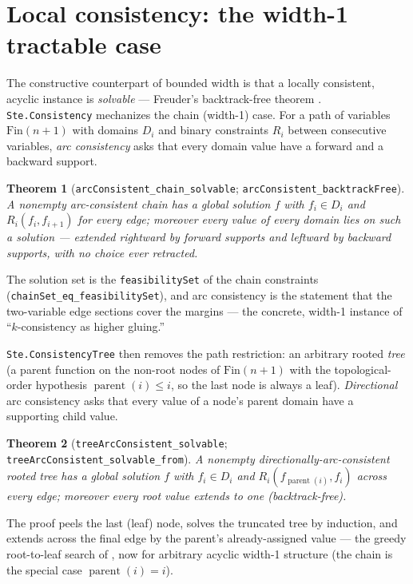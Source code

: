 \documentclass[11pt]{article}
\newtheorem{theorem}{Theorem}
\newcommand{\lean}[1]{\texttt{#1}}
\begin{document}
\section{Local consistency: the width-1 tractable case}

The constructive counterpart of bounded width is that a locally
consistent, acyclic instance is \emph{solvable} --- Freuder's
backtrack-free theorem \citep{freuder1982backtrack}.
\lean{Ste.Consistency} mechanizes the chain (width-1) case.  For a path
of variables $\mathrm{Fin}(n+1)$ with domains $D_i$ and binary
constraints $R_i$ between consecutive variables, \emph{arc consistency}
asks that every domain value have a forward and a backward support.

\begin{theorem}[\lean{arcConsistent\_chain\_solvable};
\lean{arcConsistent\_backtrackFree}]
A nonempty arc-consistent chain has a global solution $f$ with $f_i \in
D_i$ and $R_i(f_i, f_{i+1})$ for every edge; moreover \emph{every} value
of \emph{every} domain lies on such a solution --- extended rightward by
forward supports and leftward by backward supports, with no choice ever
retracted.
\end{theorem}

\noindent The solution set is the \lean{feasibilitySet} of the chain
constraints (\lean{chainSet\_eq\_feasibilitySet}), and arc consistency
is the statement that the two-variable edge sections cover the margins
--- the concrete, width-1 instance of ``$k$-consistency as higher
gluing.''

\lean{Ste.ConsistencyTree} then removes the path restriction: an
arbitrary rooted \emph{tree} (a parent function on the non-root nodes of
$\mathrm{Fin}(n{+}1)$ with the topological-order hypothesis
$\operatorname{parent}(i) \le i$, so the last node is always a leaf).
\emph{Directional} arc consistency asks that every value of a node's
parent domain have a supporting child value.

\begin{theorem}[\lean{treeArcConsistent\_solvable};
\lean{treeArcConsistent\_solvable\_from}]
A nonempty directionally-arc-consistent rooted tree has a global
solution $f$ with $f_i \in D_i$ and $R_i(f_{\operatorname{parent}(i)},
f_{i})$ across every edge; moreover every root value extends to one
(backtrack-free).
\end{theorem}

\noindent The proof peels the last (leaf) node, solves the truncated
tree by induction, and extends across the final edge by the parent's
already-assigned value --- the greedy root-to-leaf search of
\citet{freuder1982backtrack}, now for arbitrary acyclic width-1
structure (the chain is the special case
$\operatorname{parent}(i) = i$).
\end{document}

